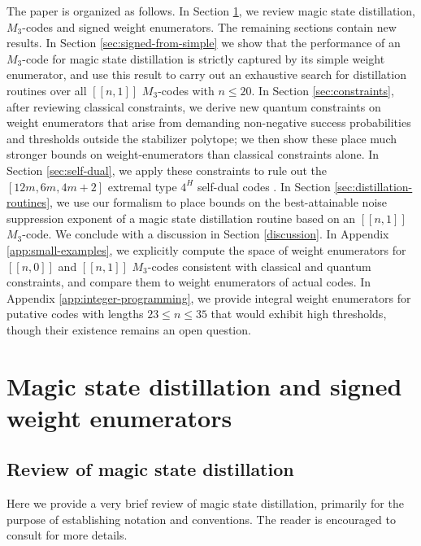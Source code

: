 \documentclass[11pt]{article}
\begin{document}
The paper is organized as follows. In Section \ref{sec:basics}, we review magic state distillation, $M_3$-codes and signed weight enumerators. The remaining sections contain new results. In Section \ref{sec:signed-from-simple} we show that the performance of an $M_3$-code for magic state distillation is strictly captured by its simple weight enumerator, and use this result to carry out an exhaustive search for distillation routines over all $[[n,1]]$ $M_3$-codes with $n \leq 20$. In Section \ref{sec:constraints}, after reviewing classical constraints, we derive new quantum  constraints on weight enumerators that arise from demanding non-negative success probabilities and thresholds outside the stabilizer polytope; we then show these place much stronger bounds on weight-enumerators than classical constraints alone. In Section \ref{sec:self-dual}, we apply these constraints to rule out the $[12m, 6m, 4m+2]$ extremal type $4^H$ self-dual codes .  In Section \ref{sec:distillation-routines}, we use our formalism to place bounds on the best-attainable noise suppression exponent of a magic state distillation routine based on an $[[n,1]]$ $M_3$-code. We conclude with a discussion in Section \ref{discussion}. In Appendix \ref{app:small-examples}, we explicitly compute the space of weight enumerators for $[[n,0]]$ and $[[n,1]]$ $M_3$-codes consistent with classical and quantum constraints, and compare them to weight enumerators of actual codes. In Appendix \ref{app:integer-programming}, we provide integral weight enumerators for putative codes with lengths $23 \leq n \leq 35$ that would exhibit high thresholds, though their existence remains an open question.


\section{Magic state distillation and signed weight enumerators}
\label{sec:basics}

\subsection{Review of magic state distillation}

Here we provide a very brief review of magic state distillation, primarily for the purpose of establishing notation and conventions. The reader is encouraged to consult \cite{MSD} for more details.
\end{document}
